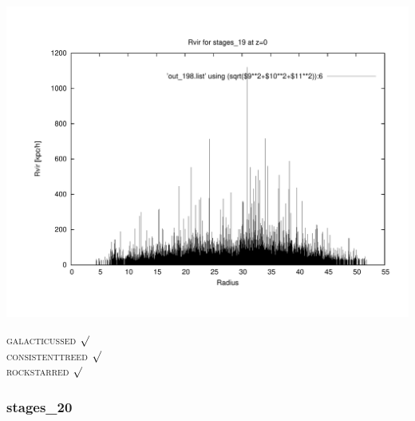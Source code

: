 \includegraphics[scale=0.3]{r256/h100/stages_19/plot_rvir_z0.pdf}



\textsc{galacticussed} $\surd$ \\
\textsc{consistenttreed} $\surd$ \\ 
\textsc{rockstarred} $\surd$

% 
%
%
%
%
%
%
%

\newpage
\subsubsection{stages\_20}

